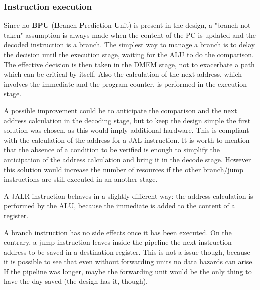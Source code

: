 \documentclass[a4paper]{article}
\begin{document}
\subsubsection{Instruction execution}
Since no \textbf{BPU} (\textbf{B}ranch \textbf{P}rediction \textbf{U}nit) is present in the design, a "branch not taken" assumption is always made when the content of the PC is updated and the decoded instruction is a branch. The simplest way to manage a branch is to delay the decision until the execution stage, waiting for the ALU to do the comparison. The effective decision is then taken in the DMEM stage, not to exacerbate a path which can be critical by itself.
Also the calculation of the next address, which involves the immediate and the program counter, is performed in the execution stage.

A possible improvement could be to anticipate the comparison and the next address calculation in the decoding stage, but to keep the design simple the first solution was chosen, as this would imply additional hardware.
This is compliant with the calculation of the address for a JAL instruction. It is worth to mention that the absence of a condition to be verified is enough to simplify the anticipation of the address calculation and bring it in the decode stage. However this solution would increase the number of resources if the other branch/jump instructions are still executed in an another stage.

A JALR instruction behaves in a slightly different way: the address calculation is performed by the ALU, because the immediate is added to the content of a register.

A branch instruction has no side effects once it has been executed. On the contrary, a jump instruction leaves inside the pipeline the next instruction address to be saved in a destination register. This is not a issue though, because it is possible to see that even without forwarding units no data hazards can arise. If the pipeline was longer, maybe the forwarding unit would be the only thing to have the day saved (the design has it, though).
\end{document}
